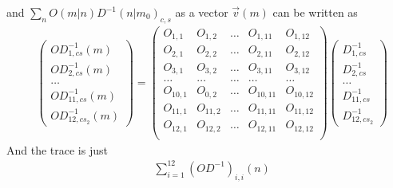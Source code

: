 and $\sum _n O(m|n)D^{-1}(n|m_0)_{c,s}$ as a vector $\vec{v}(m)$ can be written as
\begin{equation}
\begin{split}
&\left(\begin{array}{c} OD^{-1}_{1,cs}(m) \\ OD^{-1}_{2,cs}(m)  \\ \ldots  \\ OD^{-1}_{11,cs}(m) \\ OD^{-1}_{12,cs_2}(m) \end{array}\right)=\left(\begin{array}{ccccc}
O_{1,1} & O_{1,2} & \ldots &  O_{1,11} & O_{1,12} \\
O_{2,1} & O_{2,2} & \ldots &  O_{2,11} & O_{2,12} \\
O_{3,1} & O_{3,2} & \ldots &  O_{3,11} & O_{3,12} \\
\ldots & \ldots & \ldots &  \ldots & \ldots \\
O_{10,1} & O_{0,2} & \ldots & O_{10,11} & O_{10,12} \\
O_{11,1} & O_{11,2} & \ldots & O_{11,11} & O_{11,12} \\
O_{12,1} & O_{12,2} & \ldots &  O_{12,11} & O_{12,12} \\
 \end{array}\right)\left(\begin{array}{c} D^{-1}_{1,cs} \\ D^{-1}_{2,cs} \\ \ldots \\ D^{-1}_{11,cs} \\ D^{-1}_{12,cs_2}\end{array}\right)
\end{split}
\end{equation}
And the trace is just
\begin{equation}
\begin{split}
&\sum _{i=1}^{12}(OD^{-1})_{i,i}(n)
\end{split}
\end{equation}

